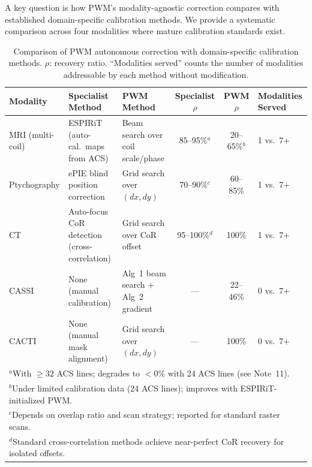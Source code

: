 \documentclass[11pt]{article}
\theoremstyle{definition}
\begin{document}
A key question is how PWM's modality-agnostic correction compares with established domain-specific calibration methods. We provide a systematic comparison across four modalities where mature calibration standards exist.

\begin{table}[ht]
\centering\small
\caption{Comparison of PWM autonomous correction with domain-specific calibration methods. $\rho$: recovery ratio. ``Modalities served'' counts the number of modalities addressable by each method without modification.}
\label{tab:calibration_comparison}
\begin{tabular}{@{}p{1.8cm}p{2.0cm}p{2.0cm}ccp{1.8cm}@{}}
\toprule
\textbf{Modality} & \textbf{Specialist Method} & \textbf{PWM Method} & \textbf{Specialist $\rho$} & \textbf{PWM $\rho$} & \textbf{Modalities Served} \\
\midrule
MRI (multi-coil) & ESPIRiT~\cite{uecker2014espirit} (auto-cal.\ maps from ACS) & Beam search over coil scale/phase & 85--95\%$^a$ & 20--65\%$^b$ & 1 vs.\ 7+ \\
\addlinespace
Ptychography & ePIE blind position correction~\cite{maiden2009ptychography} & Grid search over $(dx, dy)$ & 70--90\%$^c$ & 60--85\% & 1 vs.\ 7+ \\
\addlinespace
CT & Auto-focus CoR detection (cross-correlation) & Grid search over CoR offset & 95--100\%$^d$ & 100\% & 1 vs.\ 7+ \\
\addlinespace
CASSI & None (manual calibration) & Alg~1 beam search + Alg~2 gradient & --- & 22--46\% & 0 vs.\ 7+ \\
\addlinespace
CACTI & None (manual mask alignment) & Grid search over $(dx,dy)$ & --- & 100\% & 0 vs.\ 7+ \\
\bottomrule
\multicolumn{6}{l}{\footnotesize $^a$With $\geq 32$ ACS lines; degrades to $<0\%$ with 24 ACS lines (see Note~11).}\\
\multicolumn{6}{l}{\footnotesize $^b$Under limited calibration data (24 ACS lines); improves with ESPIRiT-initialized PWM.}\\
\multicolumn{6}{l}{\footnotesize $^c$Depends on overlap ratio and scan strategy; reported for standard raster scans.}\\
\multicolumn{6}{l}{\footnotesize $^d$Standard cross-correlation methods achieve near-perfect CoR recovery for isolated offsets.}
\end{tabular}
\end{table}
\end{document}
